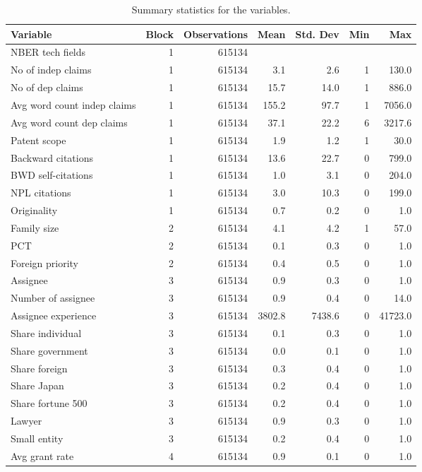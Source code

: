 \begin{table}

\caption{\label{tab:sumstats}Summary statistics for the variables.}
\centering
\begin{tabular}[t]{lrrrrrr}
\toprule
Variable & Block & Observations & Mean & Std. Dev & Min & Max\\
\midrule
NBER tech fields & 1 & 615134 &  &  &  & \\
No of indep claims & 1 & 615134 & 3.1 & 2.6 & 1 & 130.0\\
No of dep claims & 1 & 615134 & 15.7 & 14.0 & 1 & 886.0\\
Avg word count indep claims & 1 & 615134 & 155.2 & 97.7 & 1 & 7056.0\\
Avg word count dep claims & 1 & 615134 & 37.1 & 22.2 & 6 & 3217.6\\
Patent scope & 1 & 615134 & 1.9 & 1.2 & 1 & 30.0\\
Backward citations & 1 & 615134 & 13.6 & 22.7 & 0 & 799.0\\
BWD self-citations & 1 & 615134 & 1.0 & 3.1 & 0 & 204.0\\
NPL citations & 1 & 615134 & 3.0 & 10.3 & 0 & 199.0\\
Originality & 1 & 615134 & 0.7 & 0.2 & 0 & 1.0\\
\addlinespace
Family size & 2 & 615134 & 4.1 & 4.2 & 1 & 57.0\\
PCT & 2 & 615134 & 0.1 & 0.3 & 0 & 1.0\\
Foreign priority & 2 & 615134 & 0.4 & 0.5 & 0 & 1.0\\
\addlinespace
Assignee & 3 & 615134 & 0.9 & 0.3 & 0 & 1.0\\
Number of assignee & 3 & 615134 & 0.9 & 0.4 & 0 & 14.0\\
Assignee experience & 3 & 615134 & 3802.8 & 7438.6 & 0 & 41723.0\\
Share individual & 3 & 615134 & 0.1 & 0.3 & 0 & 1.0\\
Share government & 3 & 615134 & 0.0 & 0.1 & 0 & 1.0\\
Share foreign & 3 & 615134 & 0.3 & 0.4 & 0 & 1.0\\
Share Japan & 3 & 615134 & 0.2 & 0.4 & 0 & 1.0\\
Share fortune 500 & 3 & 615134 & 0.2 & 0.4 & 0 & 1.0\\
Lawyer & 3 & 615134 & 0.9 & 0.3 & 0 & 1.0\\
Small entity & 3 & 615134 & 0.2 & 0.4 & 0 & 1.0\\
\addlinespace
Avg grant rate & 4 & 615134 & 0.9 & 0.1 & 0 & 1.0\\

\end{tabular}
\end{table}
